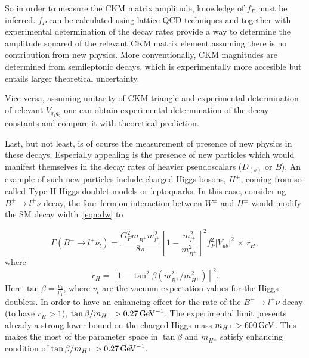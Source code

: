 So in order to measure the \gls{CKM} matrix amplitude, knowledge of $f_{P}$ must be inferred. $f_{P}$ can be calculated using lattice \gls{QCD} techniques and together with experimental determination of the decay rates provide a way to determine the amplitude squared of the relevant \gls{CKM} matrix element assuming there is no contribution from new physics. More conventionally, \gls{CKM} magnitudes are determined from semileptonic decays, which is experimentally 
more accesible but entails larger theoretical uncertainty.

Vice versa, assuming unitarity of \gls{CKM} triangle and experimental determination of relevant $V_{q_{1}q_{2}}$ one can obtain experimental determination of the decay constants and compare it with theoretical prediction.

Last, but not least, is of course the measurement of presence of new physics in these decays. Especially appealing is the presence of new particles which would manifest themselves in the decay rates of heavier pseudoscalars ($D_{(s)}$ or $B$). An example of such new particles include charged Higgs bosons, $H^{\pm}$, coming from so-called Type II Higgs-doublet models \cite{Hou:1992sy}\cite{Akeroyd:2003zr}\cite{Dobrescu:2008er} or leptoquarks\cite{Dobrescu:2008er}. In this case, considering $B^{+}\rightarrow l^{+}\nu$ decay, the four-fermion interaction between $W^{\pm}$ and $H^{\pm}$ would modify the \gls{SM} decay width~\autoref{eqn:dw} to

\begin{equation}
\Gamma(B^{+} \rightarrow {l^{+}} \nu_{l})=  
        \frac{G_{F}^{2} m^{}_{B^{+}}  m_{l^{+}}^{2}}{8\pi} 
        \left[1 - \frac{m_{l^{+}}^{2}}{m_{B^{+}}^{2}}\right]^{2}  
	f_{P}^{2} |V_{ub}|^{2} \,\times\, r_H,
\end{equation}
where
\begin{equation}
	r_H=[1-\tan^2\beta(m^{2}_{B^{+}}/m^{2}_{H^{+}})]^2.
\end{equation}
Here $\tan\beta = \frac{v_{2}}{v_{1}}$, where $v_{i}$ are the vacuum expectation values for the Higgs doublets. In order to have an enhancing effect for the rate of the $B^{+}\rightarrow l^{+}\nu$ decay (to have $r_{H}>1$), $\tan\beta/m_{H^{\pm}}> 0.27 \mathrm{\,Ge\kern -0.1em V}^{-1}$. The experimental limit presents already a strong lower bound on the charged Higgs mass $m_{H^{\pm}}>600\mathrm{\,Ge\kern -0.1em V}$\cite{Arbey:2017gmh}. This makes the most of the parameter space in $\tan\beta$ and $m_{H^{\pm}}$ satisfy enhancing condition of $\tan\beta/m_{H^{\pm}}>0.27 \mathrm{\,Ge\kern -0.1em V}^{-1}$.

